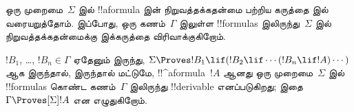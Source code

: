\documentclass[../../../include/open-logic-section]{subfiles}
\begin{document}


ஒரு முறைமை~$\Sigma$ இல் !!a{formula} இன் நிறுவத்தக்கதன்மை பற்றிய கருத்தை
 இல் வரையறுத்தோம். இப்போது, ஒரு கணம்~$\Gamma$ இலுள்ள
!!{formula}s இலிருந்து~$\Sigma$ இல் நிறுவத்தக்கதன்மைக்கு இக்கருத்தை
விரிவாக்குகிறோம்.

\begin{defn}
  $!B_1$, \dots, $!B_n \in \Gamma$ ஏதேனும் இருந்து,
  $\Sigma \Proves !B_1 \lif (!B_2 \lif \cdots (!B_n \lif !A)
  \cdots)$ ஆக இருந்தால், இருந்தால் மட்டுமே, !!^a{formula}~$!A$ ஆனது
  ஒரு முறைமை~$\Sigma$ இல் !!{formula}s கொண்ட கணம்~$\Gamma$ இலிருந்து
  !!{derivable} எனப்படுகிறது; இதை~$\Gamma \Proves[\Sigma] !A$ என எழுதுகிறோம்.
\end{defn}
\end{document}

